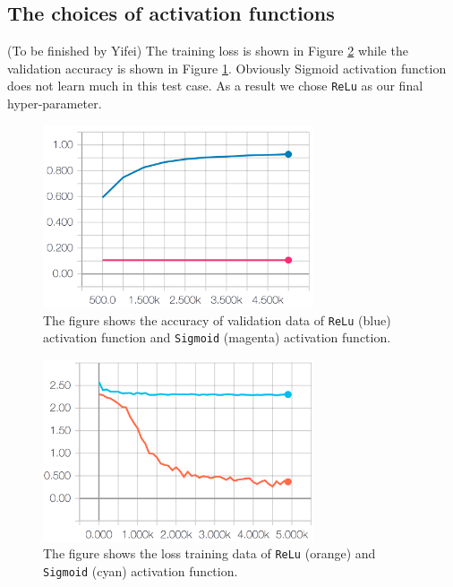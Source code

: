 \documentclass[11pt]{article}
\begin{document}
\clearpage

\subsection{The choices of activation functions}
(To be finished by Yifei)
The training loss is shown in Figure \ref{fig:af_loss} while the validation accuracy is shown in Figure \ref{fig:af_accuracy}. Obviously Sigmoid activation function does not learn much in this test case. As a result we chose {\tt ReLu} as our final hyper-parameter.


\begin{figure}[!htb]
   \centering
   \includegraphics[width=8cm]{images/af_accuracy.png} %
   \caption{The figure shows the accuracy of validation data of {\tt ReLu} (blue) activation function and {\tt Sigmoid} (magenta) activation function. }
   \label{fig:af_accuracy}
\end{figure}



\begin{figure}[!htb]
   \centering
   \includegraphics[width=8cm]{images/af_loss.png} %
   \caption{The figure shows the loss training data of {\tt ReLu} (orange) and {\tt Sigmoid} (cyan) activation function. }
   \label{fig:af_loss}
\end{figure}
\end{document}
